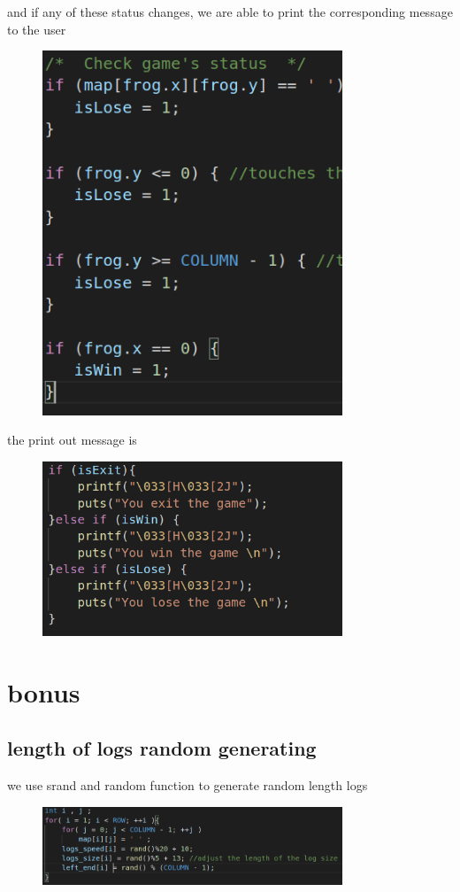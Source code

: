\documentclass{article}
\begin{document}
and if any of these status changes, we are able to print the corresponding message to the user
\begin{figure}[htbp]
    \centering
    \includegraphics[height = 0.5\textwidth,width = 0.8\textwidth]{status.png}
\end{figure}
\clearpage
the print out message is
\begin{figure}[htbp]
    \centering
    \includegraphics[width = 0.8\textwidth]{print.png}
\end{figure}

\section{bonus}

\subsection{length of logs random generating}
we use srand and random function to generate random length logs
\begin{figure}[htbp]
    \centering
    \includegraphics[width = 0.8\textwidth]{logset.png}
\end{figure}
\end{document}
